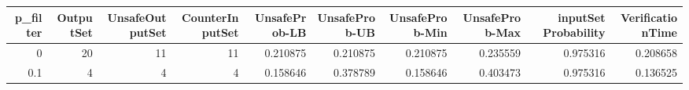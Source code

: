\begin{tabular}{rrrrrrrrrr}
\hline
   p\_filter &   OutputSet &   UnsafeOutputSet &   CounterInputSet &   UnsafeProb-LB &   UnsafeProb-UB &   UnsafeProb-Min &   UnsafeProb-Max &   inputSet Probability &   VerificationTime \\
\hline
        0   &          20 &                11 &                11 &        0.210875 &        0.210875 &         0.210875 &         0.235559 &               0.975316 &           0.208658 \\
        0.1 &           4 &                 4 &                 4 &        0.158646 &        0.378789 &         0.158646 &         0.403473 &               0.975316 &           0.136525 \\
\hline
\end{tabular}
